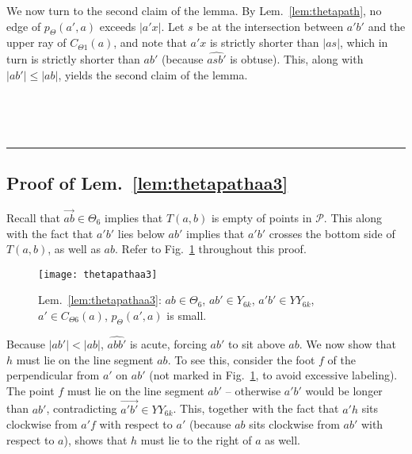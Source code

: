 \documentclass[11pt]{article}
\newcommand\cone{{C}}
\newcommand\Pt{\mathcal P}
\newcommand\ang[1]{\widehat{#1}}
\newcommand{\arr}[1]{\overrightarrow{#1}}
\newcommand{\qed}{\rule{0.5em}{1.5ex}}
\newcommand{\fqed}{{\hfill~\qed}}
\newcommand{\eproof}{{\hfill~\fqed} \vspace{1em}}
\begin{document}
We now turn to the second claim of the lemma. By Lem.~\ref{lem:thetapath}, no edge of $p_\Theta(a',a)$ exceeds $|a'x|$. Let $s$ be at the intersection between $a'b'$ and the upper ray of $C_{\Theta1}(a)$, and note that
$a'x$ is strictly shorter than $|as|$, which in turn is strictly shorter than $ab'$ (because $\ang{asb'}$ is obtuse). This, along with $|ab'| \le |ab|$, yields the second claim of the lemma.
\eproof

\subsection{Proof of Lem.~\ref{lem:thetapathaa3}}
Recall that $\arr{ab} \in \Theta_6$ implies that $T(a, b)$ is empty of points in $\Pt$. This along with the fact that $a'b'$ lies below $ab'$ implies that $a'b'$ crosses the bottom side of $T(a,b)$, as well as $ab$. Refer to Fig.~\ref{fig:thetapathaa3} throughout this proof.
\begin{figure}[htpb]
\centering
\texttt{[image: thetapathaa3]}
\caption{Lem.~\ref{lem:thetapathaa3}: $ab \in \Theta_6$, $ab' \in Y_{6k}$, $a'b' \in YY_{6k}$, $a' \in \cone_{\Theta6}(a)$, $p_\Theta(a',a)$ is small.}
\label{fig:thetapathaa3}
\end{figure}
Because $|ab'| < |ab|$, $\ang{abb'}$ is acute, forcing $ab'$ to sit above $ab$. We now show that $h$ must lie on the line segment $ab$. To see this, consider the foot $f$ of the perpendicular from $a'$ on $ab'$ (not marked in Fig.~\ref{fig:thetapathaa3}, to avoid excessive labeling). The point $f$ must lie on the line segment $ab'$ --  otherwise $a'b'$ would be longer than $ab'$, contradicting $\arr{a'b'} \in YY_{6k}$. This, together with the fact that $a'h$ sits clockwise from  $a'f$ with respect to $a'$ (because $ab$ sits clockwise from $ab'$ with respect to $a$), shows that $h$ must lie to the right of $a$ as well.
\end{document}
